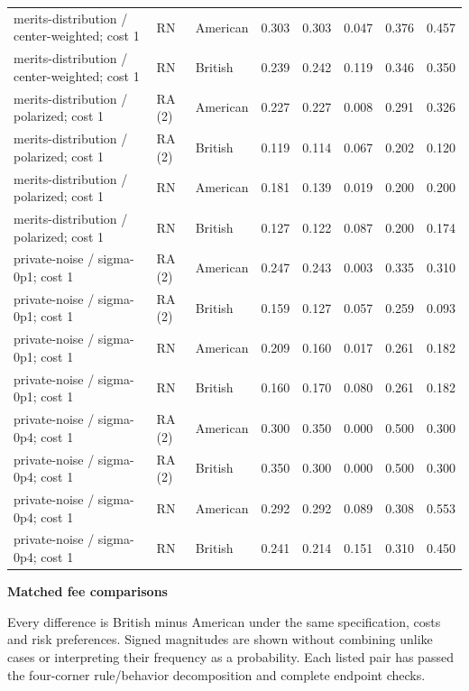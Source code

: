 \documentclass[10pt]{article}
\begin{document}
\begin{longtable}{@{}p{3.0in}llrrrrr@{}}
merits-distribution / center-weighted; cost 1 & RN & American & 0.303 & 0.303 & 0.047 & 0.376 & 0.457\\
merits-distribution / center-weighted; cost 1 & RN & British & 0.239 & 0.242 & 0.119 & 0.346 & 0.350\\
merits-distribution / polarized; cost 1 & RA (2) & American & 0.227 & 0.227 & 0.008 & 0.291 & 0.326\\
merits-distribution / polarized; cost 1 & RA (2) & British & 0.119 & 0.114 & 0.067 & 0.202 & 0.120\\
merits-distribution / polarized; cost 1 & RN & American & 0.181 & 0.139 & 0.019 & 0.200 & 0.200\\
merits-distribution / polarized; cost 1 & RN & British & 0.127 & 0.122 & 0.087 & 0.200 & 0.174\\
private-noise / sigma-0p1; cost 1 & RA (2) & American & 0.247 & 0.243 & 0.003 & 0.335 & 0.310\\
private-noise / sigma-0p1; cost 1 & RA (2) & British & 0.159 & 0.127 & 0.057 & 0.259 & 0.093\\
private-noise / sigma-0p1; cost 1 & RN & American & 0.209 & 0.160 & 0.017 & 0.261 & 0.182\\
private-noise / sigma-0p1; cost 1 & RN & British & 0.160 & 0.170 & 0.080 & 0.261 & 0.182\\
private-noise / sigma-0p4; cost 1 & RA (2) & American & 0.300 & 0.350 & 0.000 & 0.500 & 0.300\\
private-noise / sigma-0p4; cost 1 & RA (2) & British & 0.350 & 0.300 & 0.000 & 0.500 & 0.300\\
private-noise / sigma-0p4; cost 1 & RN & American & 0.292 & 0.292 & 0.089 & 0.308 & 0.553\\
private-noise / sigma-0p4; cost 1 & RN & British & 0.241 & 0.214 & 0.151 & 0.310 & 0.450\\
\end{longtable}\normalsize
\newpage
{\LARGE\bfseries Matched fee comparisons}\par\medskip
Every difference is British minus American under the same specification, costs and risk preferences. Signed magnitudes are shown without combining unlike cases or interpreting their frequency as a probability. Each listed pair has passed the four-corner rule/behavior decomposition and complete endpoint checks.\par\medskip
\end{document}

